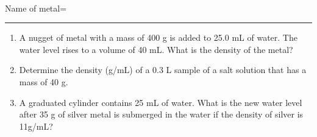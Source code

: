 \documentclass[main.tex]{subfiles}
\begin{document}
\newpage
\begin{fullwidth}
\begin{center}
 \\
\vspace{0.2cm}
Name of metal=\rule{5cm}{0.4pt}
\end{center}

\vspace{0.2cm}{\large \bfseries 6. PostLab questions }

\begin{enumerate}
\item 
A nugget of metal with a mass of 400 g is added to 25.0 mL of water.  The water level rises to a volume of 40 mL.  What is the density of the metal?   

\vspace{2.5cm}
\item Determine the density (g/mL) of a 0.3 L sample of a salt solution that has a mass of 40 g.
\vspace{2.5cm}

\item A graduated cylinder contains 25 mL of water. What is the new water level after
35 g of silver metal is submerged in the water if the density of silver is 11g/mL?\vspace{2.5cm}

\end{enumerate}



\end{fullwidth}
\end{document}
